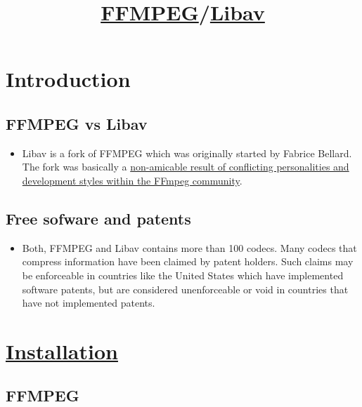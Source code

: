 
\title{\href{https://www.ffmpeg.org}{FFMPEG}/\href{https://libav.org}{Libav}}

\maketitle
\tableofcontents

\chapter{Introduction}

\section{FFMPEG vs Libav}

\begin{itemize}
\item Libav is a fork of FFMPEG which was originally started by
  Fabrice Bellard. The fork was basically
  a \href{http://blog.pkh.me/p/13-the-ffmpeg-libav-situation.html}{non-amicable
  result of conflicting personalities and development styles within
  the FFmpeg community}.
\end{itemize}


\section{Free sofware and patents}

\begin{itemize}
\item Both, FFMPEG and Libav contains more than 100 codecs. Many
  codecs that compress information have been claimed by patent
  holders. Such claims may be enforceable in countries like the United
  States which have implemented software patents, but are considered
  unenforceable or void in countries that have not implemented
  patents.
\end{itemize}



\chapter{\href{https://trac.ffmpeg.org/wiki/CompilationGuide}{Installation}}

\section{FFMPEG}

